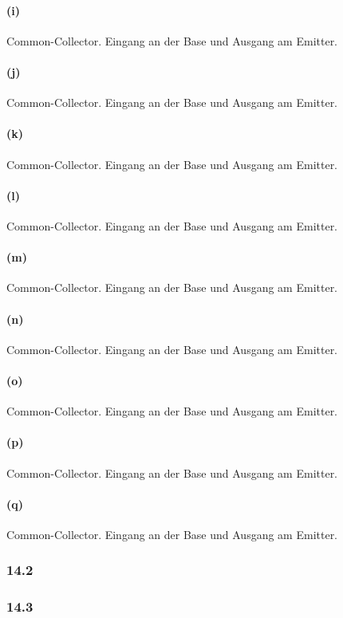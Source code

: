 \documentclass[11pt,a4paper,titlepage]{article}
\begin{document}
\paragraph{(i)} Common-Collector. Eingang an der Base und Ausgang am Emitter.
\paragraph{(j)} Common-Collector. Eingang an der Base und Ausgang am Emitter.
\paragraph{(k)} Common-Collector. Eingang an der Base und Ausgang am Emitter.
\paragraph{(l)} Common-Collector. Eingang an der Base und Ausgang am Emitter.
\paragraph{(m)} Common-Collector. Eingang an der Base und Ausgang am Emitter.
\paragraph{(n)} Common-Collector. Eingang an der Base und Ausgang am Emitter.
\paragraph{(o)} Common-Collector. Eingang an der Base und Ausgang am Emitter.
\paragraph{(p)} Common-Collector. Eingang an der Base und Ausgang am Emitter.
\paragraph{(q)} Common-Collector. Eingang an der Base und Ausgang am Emitter.

\subsubsection*{14.2}

\subsubsection*{14.3}
\end{document}
